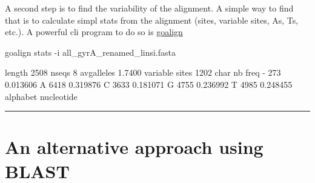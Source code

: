 \documentclass[
  letterpaper,
  DIV=11,
  numbers=noendperiod]{scrreprt}
\newenvironment{Shaded}{\begin{snugshade}}{\end{snugshade}}
\newcommand{\AttributeTok}[1]{\textcolor[rgb]{0.40,0.46,0.14}{#1}}
\newcommand{\ExtensionTok}[1]{\textcolor[rgb]{0.00,0.46,0.62}{#1}}
\newcommand{\NormalTok}[1]{\textcolor[rgb]{0.00,0.46,0.62}{#1}}
\begin{document}
A second step is to find the variability of the alignment. A simple way
to find that is to calculate simpl stats from the alignment (sites,
variable sites, As, Ts, etc.). A powerful cli program to do so is
\href{https://github.com/evolbioinfo/goalign}{goalign}

\begin{Shaded}
\begin{Highlighting}[]
\ExtensionTok{goalign}\NormalTok{ stats }\AttributeTok{{-}i}\NormalTok{ all\_gyrA\_renamed\_linsi.fasta}
\end{Highlighting}
\end{Shaded}

\begin{Shaded}
\begin{Highlighting}[]
\ExtensionTok{length}\NormalTok{  2508}
\ExtensionTok{nseqs}\NormalTok{   8}
\ExtensionTok{avgalleles}\NormalTok{  1.7400}
\ExtensionTok{variable}\NormalTok{ sites  1202}
\ExtensionTok{char}\NormalTok{    nb  freq}
\ExtensionTok{{-}}\NormalTok{   273 0.013606}
\ExtensionTok{A}\NormalTok{   6418    0.319876}
\ExtensionTok{C}\NormalTok{   3633    0.181071}
\ExtensionTok{G}\NormalTok{   4755    0.236992}
\ExtensionTok{T}\NormalTok{   4985    0.248455}
\ExtensionTok{alphabet}\NormalTok{    nucleotide}
\end{Highlighting}
\end{Shaded}

\begin{center}\rule{0.5\linewidth}{0.5pt}\end{center}

\hypertarget{an-alternative-approach-using-blast}{%
\section*{An alternative approach using
BLAST}\label{an-alternative-approach-using-blast}}
\end{document}
